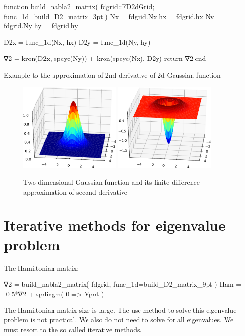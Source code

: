 \begin{juliacode}
function build_nabla2_matrix( fdgrid::FD2dGrid; func_1d=build_D2_matrix_3pt )
    Nx = fdgrid.Nx
    hx = fdgrid.hx
    Ny = fdgrid.Ny
    hy = fdgrid.hy

    D2x = func_1d(Nx, hx)
    D2y = func_1d(Ny, hy)

    ∇2 = kron(D2x, speye(Ny)) + kron(speye(Nx), D2y)
    return ∇2
end
\end{juliacode}

Example to the approximation of 2nd derivative of 2d Gaussian function

\begin{figure}[H]
{\center
\includegraphics[width=0.45\textwidth]{../codes/FD2d/IMG_gaussian2d.pdf}
\includegraphics[width=0.45\textwidth]{../codes/FD2d/IMG_d2_gaussian2d.pdf}
\par}
\caption{Two-dimensional Gaussian function and its finite difference
approximation of second derivative}
\end{figure}

\section{Iterative methods for eigenvalue problem}

The Hamiltonian matrix:
\begin{juliacode}
∇2 = build_nabla2_matrix( fdgrid, func_1d=build_D2_matrix_9pt )
Ham = -0.5*∇2 + spdiagm( 0 => Vpot )
\end{juliacode}

The Hamiltonian matrix size is large. The use  method
to solve this eigenvalue problem is not practical.
We also do not need to solve for all eigenvalues.
We must resort to the
so called iterative methods.
